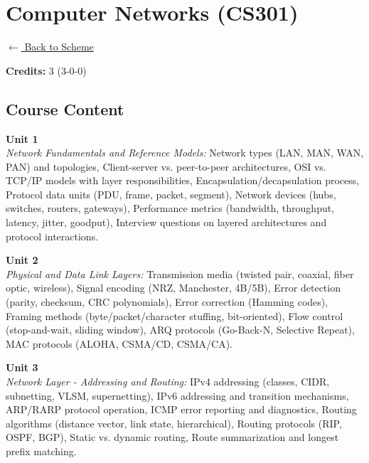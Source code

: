 \section*{Computer Networks (CS301)}
\label{course:CS301}

\noindent \small{\hyperref[main:scheme]{$\leftarrow$ Back to Scheme}} \vspace{0.5cm}

\noindent \textbf{Credits:} 3 (3-0-0)

\subsection*{Course Content}
\noindent\textbf{Unit 1} \\
\textit{Network Fundamentals and Reference Models:} Network types (LAN, MAN, WAN, PAN) and topologies, Client-server vs. peer-to-peer architectures, OSI vs. TCP/IP models with layer responsibilities, Encapsulation/decapsulation process, Protocol data units (PDU, frame, packet, segment), Network devices (hubs, switches, routers, gateways), Performance metrics (bandwidth, throughput, latency, jitter, goodput), Interview questions on layered architectures and protocol interactions.

\vspace{0.3cm}

\noindent\textbf{Unit 2} \\
\textit{Physical and Data Link Layers:} Transmission media (twisted pair, coaxial, fiber optic, wireless), Signal encoding (NRZ, Manchester, 4B/5B), Error detection (parity, checksum, CRC polynomials), Error correction (Hamming codes), Framing methods (byte/packet/character stuffing, bit-oriented), Flow control (stop-and-wait, sliding window), ARQ protocols (Go-Back-N, Selective Repeat), MAC protocols (ALOHA, CSMA/CD, CSMA/CA).

\vspace{0.3cm}

\noindent\textbf{Unit 3} \\
\textit{Network Layer - Addressing and Routing:} IPv4 addressing (classes, CIDR, subnetting, VLSM, supernetting), IPv6 addressing and transition mechanisms, ARP/RARP protocol operation, ICMP error reporting and diagnostics, Routing algorithms (distance vector, link state, hierarchical), Routing protocols (RIP, OSPF, BGP), Static vs. dynamic routing, Route summarization and longest prefix matching.

\vspace{0.3cm}

